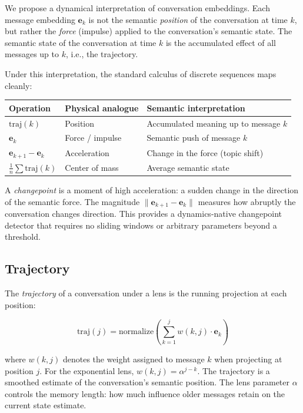 \documentclass[11pt]{article}
\begin{document}
We propose a dynamical interpretation of conversation embeddings. Each message embedding $\mathbf{e}_k$ is not the semantic \emph{position} of the conversation at time $k$, but rather the \emph{force} (impulse) applied to the conversation's semantic state. The semantic state of the conversation at time $k$ is the accumulated effect of all messages up to $k$, i.e., the trajectory.

Under this interpretation, the standard calculus of discrete sequences maps cleanly:

\begin{center}
\begin{tabular}{lll}
\toprule
Operation & Physical analogue & Semantic interpretation \\
\midrule
$\text{traj}(k)$ & Position & Accumulated meaning up to message $k$ \\
$\mathbf{e}_k$ & Force / impulse & Semantic push of message $k$ \\
$\mathbf{e}_{k+1} - \mathbf{e}_k$ & Acceleration & Change in the force (topic shift) \\
$\frac{1}{n}\sum \text{traj}(k)$ & Center of mass & Average semantic state \\
\bottomrule
\end{tabular}
\end{center}

A \emph{changepoint} is a moment of high acceleration: a sudden change in the direction of the semantic force. The magnitude $\|\mathbf{e}_{k+1} - \mathbf{e}_k\|$ measures how abruptly the conversation changes direction. This provides a dynamics-native changepoint detector that requires no sliding windows or arbitrary parameters beyond a threshold.

\subsection{Trajectory}

The \emph{trajectory} of a conversation under a lens is the running projection at each position:

\begin{equation}
\text{traj}(j) = \text{normalize}\left(\sum_{k=1}^{j} w(k, j) \cdot \mathbf{e}_k\right)
\end{equation}

where $w(k, j)$ denotes the weight assigned to message $k$ when projecting at position $j$. For the exponential lens, $w(k, j) = \alpha^{j-k}$. The trajectory is a smoothed estimate of the conversation's semantic position. The lens parameter $\alpha$ controls the memory length: how much influence older messages retain on the current state estimate.
\end{document}
